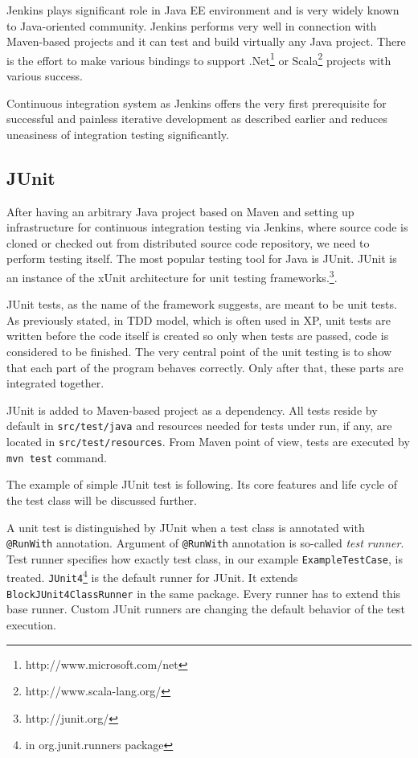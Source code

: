 \documentclass[12pt,final,oneside]{fithesis}
\begin{document}
Jenkins plays significant role in Java EE environment and is very widely known to Java-oriented community. Jenkins performs very well in connection with Maven-based projects and it can test and build virtually any Java project. There is the effort to make various bindings to support .Net\footnote{http://www.microsoft.com/net} or Scala\footnote{http://www.scala-lang.org/} projects with various success.

Continuous integration system as Jenkins offers the very first prerequisite for successful and painless iterative development as described earlier and reduces uneasiness of integration testing significantly.

		\subsection{JUnit}
		
After having an arbitrary Java project based on Maven and setting up infrastructure for continuous integration testing via Jenkins, where source code is cloned or checked out from distributed source code repository, we need to perform testing itself. The most popular testing tool for Java is JUnit. JUnit is an instance of the xUnit architecture for unit testing frameworks.\footnote{http://junit.org/}.

JUnit tests, as the name of the framework suggests, are meant to be unit tests. As previously stated, in TDD model, which is often used in XP, unit tests are written before the code itself is created so only when tests are passed, code is considered to be finished. The very central point of the unit testing is to show that each part of the program behaves correctly. Only after that, these parts are integrated together.

JUnit is added to Maven-based project as a dependency. All tests reside by default in \texttt{src/test/java} and resources needed for tests under run, if any, are located in \texttt{src/test/resources}. From Maven point of view, tests are executed by \texttt{mvn test} command.

The example of simple JUnit test is following. Its core features and life cycle of the test class will be discussed further.

\newpage



A unit test is distinguished by JUnit when a test class is annotated with \texttt{@RunWith} annotation. Argument of \texttt{@RunWith} annotation is so-called \textit{test runner}. Test runner specifies how exactly test class, in our example \texttt{ExampleTestCase}, is treated. \texttt{JUnit4}\footnote{in org.junit.runners package} is the default runner for JUnit. It extends \texttt{BlockJUnit4ClassRunner} in the same package. Every runner has to extend this base runner. Custom JUnit runners are changing the default behavior of the test execution.
\end{document}
